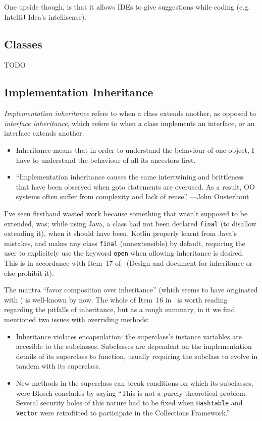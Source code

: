\documentclass{article}
\begin{document}
One upside though, is that it allows IDEs to give suggestions while coding
(e.g. IntelliJ Idea's intellisense).

\subsection{Classes}
TODO

\subsection{Implementation Inheritance}
\textit{Implementation inheritance} refers to when a class extends another, as opposed
to \textit{interface inheritance}, which refers to when a class implements an
interface, or an interface extends another.

\begin{itemize}
  \item Inheritance means that in order to understand the behaviour of one object, I have to understand the behaviour of all its ancestors first.
  \item \enquote{Implementation inheritance causes the same intertwining and
brittleness that have been observed when goto statements are overused. As a
result, OO systems often suffer from complexity and lack of reuse}
---John Ousterhout\cite{Ous97}

\end{itemize}

I've seen firsthand wasted work because something that wasn't supposed to be
extended, was; while using Java, a class had not been declared \texttt{final}
(to disallow extending it), when it should have been. Kotlin properly learnt
from Java's mistakes, and makes any class \texttt{final} (nonextensible)
by default, requiring the user to explicitely use the keyword \texttt{open}
when allowing inheritance is desired. This is in accordance with Item~17
of~\cite{Blo08} (Design and document for inheritance or else prohibit it).

The mantra ``favor composition over inheritance'' (which seems to have
originated with \cite{GoF94}) is well-known by now. The whole of Item~16
in~\cite{Blo08} is worth reading regarding the pitfalls of inheritance, but
as a rough summary, in it we find mentioned two issues with overriding
methods:

\begin{itemize}
  \item Inheritance violates encapsulation\cite{DBLP:conf/oopsla/Snyder86}:
  the superclass's instance variables are accesible to the subclasses.
  Subclasses are dependent on the implementation details of its superclass to
  function, usually requiring the subclass to evolve in tandem with its
  superclass.
  \item New methods in the superclass can break conditions on which its
  subclasses, were Blosch concludes by saying \enquote{This is not a purely
  theoretical problem. Several security holes of this nature had to be fixed
  when \texttt{Hashtable} and \texttt{Vector} were retrofitted to participate
  in the Collections Framework.}
\end{itemize}
\end{document}
